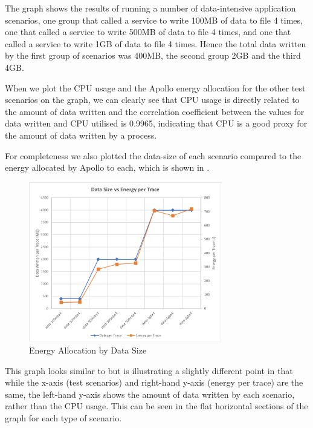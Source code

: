 The graph shows the results of running a number of data-intensive application scenarios, one group that called a service to write 100MB of data to file 4 times, one that called a service to write 500MB of data to file 4 times, and one that called a service to write 1GB of data to file 4 times.  Hence the total data written by the first group of scenarios was 400MB, the second group 2GB and the third 4GB.

When we plot the CPU usage and the Apollo energy allocation for the other test scenarios on the graph, we can clearly see that CPU usage is directly related to the amount of data written and the correlation coefficient between the values for data written and CPU utilised is 0.9965, indicating that CPU is a good proxy for the amount of data written by a process.

For completeness we also plotted the data-size of each scenario compared to the energy allocated by Apollo to each, which is shown in .  

\begin{figure}
\centering
\includegraphics[width=0.75\textwidth,trim={2 2 2 2},clip]{Figures/validation-energybydatasize}
\caption{Energy Allocation by Data Size}
\label{figure:validation-energybydatasize}
\end{figure}

This graph looks similar to  but is illustrating a slightly different point in that while the x-axis (test scenarios) and right-hand y-axis (energy per trace) are the same, the left-hand y-axis shows the amount of data written by each scenario, rather than the CPU usage.  This can be seen in the flat horizontal sections of the graph for each type of scenario.  

